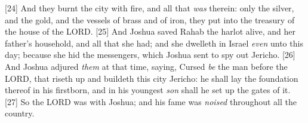[24] \textcolor[cmyk]{0.99998,1,0,0}{And they burnt the city with fire, and all that \emph{was} therein: only the silver, and the gold, and the vessels of brass and of iron, they put into the treasury of the house of the LORD.}
[25] \textcolor[cmyk]{0.99998,1,0,0}{And Joshua saved Rahab the harlot alive, and her father's household, and all that she had; and she dwelleth in Israel \emph{even} unto this day; because she hid the messengers, which Joshua sent to spy out Jericho.}
[26] \textcolor[cmyk]{0.99998,1,0,0}{And Joshua adjured \emph{them} at that time, saying, Cursed \emph{be} the man before the LORD, that riseth up and buildeth this city Jericho: he shall lay the foundation thereof in his firstborn, and in his youngest \emph{son} shall he set up the gates of it.}
[27] \textcolor[cmyk]{0.99998,1,0,0}{So the LORD was with Joshua; and his fame was \emph{noised} throughout all the country.}